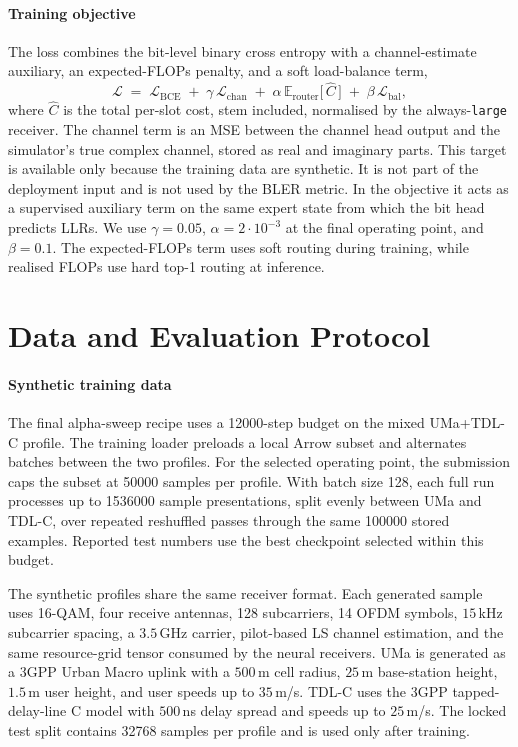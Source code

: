\paragraph{Training objective}
The loss combines the bit-level binary cross entropy with a channel-estimate auxiliary, an expected-FLOPs penalty, and a soft load-balance term,
\[
\mathcal{L} \;=\; \mathcal{L}_{\mathrm{BCE}}
  \;+\; \gamma \, \mathcal{L}_{\mathrm{chan}}
  \;+\; \alpha \, \mathbb{E}_{\mathrm{router}}\!\bigl[\,\widehat{C}\,\bigr]
  \;+\; \beta \, \mathcal{L}_{\mathrm{bal}},
\]
where $\widehat{C}$ is the total per-slot cost, stem included, normalised by the always-\texttt{large} receiver. The channel term is an MSE between the channel head output and the simulator's true complex channel, stored as real and imaginary parts. This target is available only because the training data are synthetic. It is not part of the deployment input and is not used by the BLER metric. In the objective it acts as a supervised auxiliary term on the same expert state from which the bit head predicts LLRs. We use $\gamma = 0.05$, $\alpha = 2 \cdot 10^{-3}$ at the final operating point, and $\beta = 0.1$. The expected-FLOPs term uses soft routing during training, while realised FLOPs use hard top-1 routing at inference.

\section{Data and Evaluation Protocol}
\label{sec:data}

\paragraph{Synthetic training data}
The final alpha-sweep recipe uses a \num{12000}-step budget on the mixed UMa+TDL-C profile. The training loader preloads a local Arrow subset and alternates batches between the two profiles. For the selected operating point, the submission caps the subset at \num{50000} samples per profile. With batch size \num{128}, each full run processes up to \num{1536000} sample presentations, split evenly between UMa and TDL-C, over repeated reshuffled passes through the same \num{100000} stored examples. Reported test numbers use the best checkpoint selected within this budget.

The synthetic profiles share the same receiver format. Each generated sample uses 16-QAM, four receive antennas, \num{128} subcarriers, \num{14} OFDM symbols, $15$\,kHz subcarrier spacing, a $3.5$\,GHz carrier, pilot-based LS channel estimation, and the same resource-grid tensor consumed by the neural receivers. UMa is generated as a 3GPP Urban Macro uplink with a $500$\,m cell radius, $25$\,m base-station height, $1.5$\,m user height, and user speeds up to $35$\,m/s. TDL-C uses the 3GPP tapped-delay-line C model with $500$\,ns delay spread and speeds up to $25$\,m/s. The locked test split contains \num{32768} samples per profile and is used only after training.

